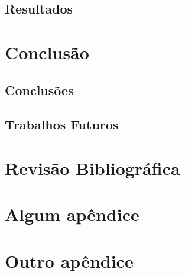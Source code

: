 \documentclass{../ufpatcc}
\begin{document}
		\section{Resultados}
		

  \chapter{Conclusão}

		\section{Conclusões}

		\section{Trabalhos Futuros}

  \chapter{Revisão Bibliográfica}
    \lipsum[1]\cite{atalholivro}
    \lipsum[2]\cite{atalhoonline}


  \appendix
    \chapter{Algum apêndice}
    \chapter{Outro apêndice}

  
\end{document}
